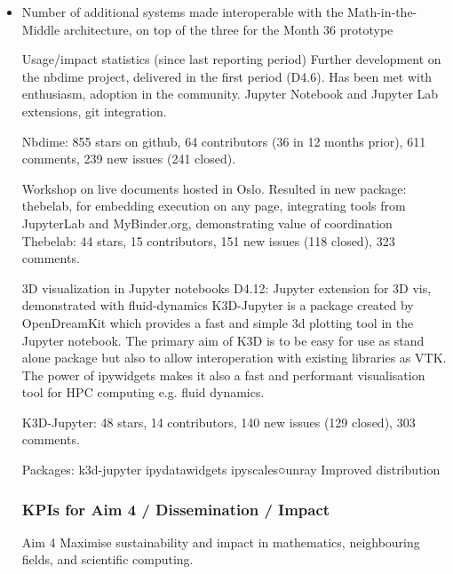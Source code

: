 \begin{Aim 1}
\begin{Aim 2}
\begin{itemize}
\item Number of additional systems made interoperable with the Math-in-the-Middle architecture, on top of the three for the Month
  36 prototype



Usage/impact statistics (since last reporting period)
Further development on the nbdime project, delivered in the first period (D4.6). Has been met with enthusiasm, adoption in the community.
Jupyter Notebook and Jupyter Lab extensions, git integration.

Nbdime: 855 stars on github, 64 contributors (36 in 12 months prior), 611 
comments, 239 new issues (241 closed).

Workshop on live documents hosted in Oslo. Resulted in new package: thebelab, for embedding execution on any page, integrating tools from 
JupyterLab and MyBinder.org, demonstrating value of coordination
Thebelab: 44 stars, 15 contributors, 151 new issues (118 closed), 323 
comments.

3D visualization in Jupyter notebooks D4.12: Jupyter extension for 3D vis, demonstrated with fluid-dynamics
K3D-Jupyter is a package created by OpenDreamKit which provides a fast and simple 3d plotting tool in the Jupyter notebook. The primary aim of K3D is to be easy for use as stand alone package but also to allow interoperation with existing libraries as VTK. The power of ipywidgets makes it also a fast and performant visualisation tool for HPC computing e.g. fluid dynamics.

K3D-Jupyter: 48 stars, 14 contributors, 140 new issues (129 closed), 303 
comments.

Packages:
k3d-jupyter
ipydatawidgets
ipyscales○unray
Improved distribution



\subsubsection{KPIs for Aim 4 / Dissemination / Impact}

\begin{recommendation}{Aim 4}
  Maximise sustainability and impact in mathematics, neighbouring fields, and scientific computing.\end{recommendation}



\end{itemize}
\end{Aim 2}
\end{Aim 1}
